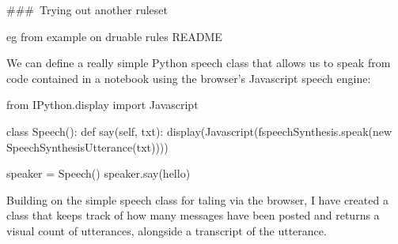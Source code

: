 \documentclass[letterpaper,10pt,english]{sphinxmanual}
\begin{document}
\#\#\# Trying out another ruleset

eg from example on druable rules README

We can define a really simple Python speech class that allows us to speak from code contained in a notebook using the browser’s Javascript speech engine:

{
\begin{sphinxVerbatim}[commandchars=\\\{\}]
\llap{\color{nbsphinxin}[ ]:\,\hspace{\fboxrule}\hspace{\fboxsep}}from IPython.display import Javascript

class Speech():
    def say(self, txt):
        display(Javascript(f\PYGZsq{}speechSynthesis.speak(new SpeechSynthesisUtterance(\PYGZdq{}\PYGZob{}txt\PYGZcb{}\PYGZdq{}))\PYGZsq{}))

speaker = Speech()
speaker.say(\PYGZsq{}hello\PYGZsq{})
\end{sphinxVerbatim}
}

Building on the simple speech class for taling via the browser, I have created a class that keeps track of how many messages have been posted and returns a visual count of utterances, alongside a transcript of the utterance.
\end{document}
